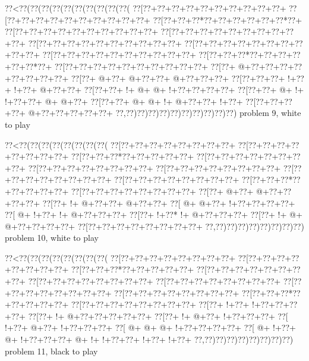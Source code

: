 \vbox{\vbox{\goo
\0??<\0??(\0??(\0??(\0??(\0??(\0??(\0??(\0??(\0??(\0??(
\0??[\0??+\0??+\0??+\0??+\0??+\0??+\0??+\0??+\0??+\0??+
\0??[\0??+\0??+\0??+\0??+\0??+\0??+\0??+\0??+\0??+\0??+
\0??[\0??+\0??+\0??*\0??+\0??+\0??+\0??+\0??+\0??*\0??+
\0??[\0??+\0??+\0??+\0??+\0??+\0??+\0??+\0??+\0??+\0??+
\0??[\0??+\0??+\0??+\0??+\0??+\0??+\0??+\0??+\0??+\0??+
\0??[\0??+\0??+\0??+\0??+\0??+\0??+\0??+\0??+\0??+\0??+
\0??[\0??+\0??+\0??+\0??+\0??+\0??+\0??+\0??+\0??+\0??+
\0??[\0??+\0??+\0??+\0??+\0??+\0??+\0??+\0??+\0??+\0??+
\0??[\0??+\0??+\0??*\0??+\0??+\0??+\0??+\0??+\0??*\0??+
\0??[\0??+\0??+\0??+\0??+\0??+\0??+\0??+\0??+\0??+\0??+
\0??[\0??+\- @+\0??+\0??+\0??+\0??+\0??+\0??+\0??+\0??+
\0??[\0??+\- @+\0??+\- @+\0??+\0??+\- @+\0??+\0??+\0??+
\0??[\0??+\0??+\0??+\- !+\0??+\- !+\0??+\- @+\0??+\0??+
\0??[\0??+\0??+\- !+\- @+\- @+\- !+\0??+\0??+\0??+\0??+
\0??[\0??+\0??+\- @+\- !+\- !+\0??+\0??+\- @+\- @+\0??+
\0??[\0??+\0??+\- @+\- @+\- !+\- @+\0??+\0??+\- !+\0??+
\0??[\0??+\0??+\0??+\0??+\- @+\0??+\0??+\0??+\0??+\0??+
\0??,\0??)\0??)\0??)\0??)\0??)\0??)\0??)\0??)\0??)\0??)
}
\hfil problem 9, white to play\hfil\break
}

\vbox{\vbox{\goo
\0??<\0??(\0??(\0??(\0??(\0??(\0??(\0??(\0??(
\0??[\0??+\0??+\0??+\0??+\0??+\0??+\0??+\0??+
\0??[\0??+\0??+\0??+\0??+\0??+\0??+\0??+\0??+
\0??[\0??+\0??+\0??*\0??+\0??+\0??+\0??+\0??+
\0??[\0??+\0??+\0??+\0??+\0??+\0??+\0??+\0??+
\0??[\0??+\0??+\0??+\0??+\0??+\0??+\0??+\0??+
\0??[\0??+\0??+\0??+\0??+\0??+\0??+\0??+\0??+
\0??[\0??+\0??+\0??+\0??+\0??+\0??+\0??+\0??+
\0??[\0??+\0??+\0??+\0??+\0??+\0??+\0??+\0??+
\0??[\0??+\0??+\0??*\0??+\0??+\0??+\0??+\0??+
\0??[\0??+\0??+\0??+\0??+\0??+\0??+\0??+\0??+
\0??[\0??+\- @+\0??+\- @+\0??+\0??+\0??+\0??+
\0??[\0??+\- !+\- @+\0??+\0??+\- @+\0??+\0??+
\0??[\- @+\- @+\0??+\- !+\0??+\0??+\0??+\0??+
\0??[\- @+\- !+\0??+\- !+\- @+\0??+\0??+\0??+
\0??[\0??+\- !+\0??*\- !+\- @+\0??+\0??+\0??+
\0??[\0??+\- !+\- @+\- @+\0??+\0??+\0??+\0??+
\0??[\0??+\0??+\0??+\0??+\0??+\0??+\0??+\0??+
\0??,\0??)\0??)\0??)\0??)\0??)\0??)\0??)\0??)
}
\hfil problem 10, white to play\hfil\break
}

\vbox{\vbox{\goo
\0??<\0??(\0??(\0??(\0??(\0??(\0??(\0??(\0??(
\0??[\0??+\0??+\0??+\0??+\0??+\0??+\0??+\0??+
\0??[\0??+\0??+\0??+\0??+\0??+\0??+\0??+\0??+
\0??[\0??+\0??+\0??*\0??+\0??+\0??+\0??+\0??+
\0??[\0??+\0??+\0??+\0??+\0??+\0??+\0??+\0??+
\0??[\0??+\0??+\0??+\0??+\0??+\0??+\0??+\0??+
\0??[\0??+\0??+\0??+\0??+\0??+\0??+\0??+\0??+
\0??[\0??+\0??+\0??+\0??+\0??+\0??+\0??+\0??+
\0??[\0??+\0??+\0??+\0??+\0??+\0??+\0??+\0??+
\0??[\0??+\0??+\0??*\0??+\0??+\0??+\0??+\0??+
\0??[\0??+\0??+\0??+\0??+\0??+\0??+\0??+\0??+
\0??[\0??+\- !+\0??+\- !+\0??+\0??+\0??+\0??+
\0??[\0??+\- !+\- @+\0??+\0??+\0??+\0??+\0??+
\0??[\0??+\- !+\- @+\0??+\- !+\0??+\0??+\0??+
\0??[\- !+\0??+\- @+\0??+\- !+\0??+\0??+\0??+
\0??[\- @+\- @+\- @+\- !+\0??+\0??+\0??+\0??+
\0??[\- @+\- !+\0??+\- @+\- !+\0??+\0??+\0??+
\- @+\- !+\- !+\0??+\0??+\- !+\0??+\- !+\0??+
\0??,\0??)\0??)\0??)\0??)\0??)\0??)\0??)\0??)
}
\hfil problem 11, black to play\hfil\break
}

